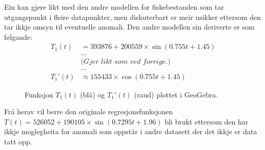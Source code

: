 \documentclass{report}
\begin{document}
Ein kan gjere likt med den andre modellen for fiskebestanden som tar utgangspunkt i fleire datapunkter, men diskuterbart er meir usikker ettersom den tar ikkje omsyn til eventuelle anomali.
Den andre modellen sin deriverte er som følgande:
\begin{align*} 
    T_{1}(t) &= 393876+200559\times \sin(0.755t+1.45) \\ 
    & ... \\
    & \textit{(Gjer likt som ved forrige.)} \\
    & ... \\
    T_{1}'(t) &\approx 155433 \times \cos(0.755t+1.45)
\end{align*}
\begin{figure}[H]
    \centering
    \caption{Funksjon $T_{1}(t)$ (blå) og $T_{1}'(t)$ (raud) plottet i GeoGebra.}
    \label{F5}
\end{figure}
Frå herav vil berre den originale regresjonsfunksjonen $T(t)=526052+190105\times \sin(0.7295t+1.96)$ bli brukt ettersom den har ikkje moglegheita for anomali som oppstår i andre datasett der det ikkje er data tatt opp.
\end{document}
